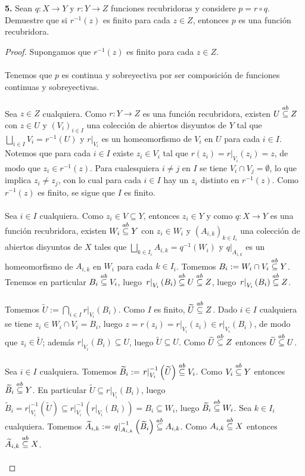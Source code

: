\textbf{5.} Sean $q:X\to Y$ y $r:Y\to Z$ funciones recubridoras y considere $p=r\circ q$. Demuestre que si $r^{-1}(z)$ es finito para cada $z\in Z$, entonces $p$ es una función recubridora.
\begin{proof}
   Supongamos que $r^{-1}(z)$ es finito para cada $z\in Z$.\\\\
   Tenemos que $p$ es continua y sobreyectiva por ser composición de funciones continuas y sobreyectivas.\\\\
   Sea $z\in Z$ cualquiera. Como $r:Y\to Z$ es una función recubridora, existen $U\stackrel{ab}{\subseteq} Z$ con $z\in U$ y $\left( V_i\right)_{i\in I}$ una colección de abiertos disyuntos de $Y$ tal que $\bigsqcup_{i\in I}V_i=r^{-1}(U)$ y $\left.r\right|_{V_i}$ es un homeomorfismo de $V_i$ en $U$ para cada $i\in I$. Notemos que para cada $i\in I$ existe $z_i\in V_i$ tal que $r(z_i)=\left.r\right|_{V_i}(z_i)=z$, de modo que $z_i\in r^{-1}(z)$. Para cualesquiera $i\ne j$ en $I$ se tiene $V_i\cap V_j=\emptyset$, lo que implica $z_i\ne z_j$, con lo cual para cada $i\in I$ hay un $z_i$ distinto en $r^{-1}(z)$. Como $r^{-1}(z)$ es finito, se sigue que $I$ es finito.\\\\
   Sea $i\in I$ cualquiera. Como $z_i\in V\subseteq Y$, entonces $z_i\in Y$ y como $q:X\to Y$ es una función recubridora, existen $W_i\stackrel{ab}{\subseteq} Y$ con $z_i\in W_i$ y $\left( A_{i,k}\right)_{k\in I_i}$ una colección de abiertos disyuntos de $X$ tales que $\bigsqcup_{k\in I_i}A_{i,k}=q^{-1}\left( W_i\right)$ y $\left.q\right|_{A_{i,k}}$ es un homeomorfismo de $A_{i,k}$ en $W_i$ para cada $k\in I_i$. Tomemos $B_i:=W_i\cap V_i\stackrel{ab}{\subseteq} Y$. Tenemos en particular $B_i\stackrel{ab}{\subseteq} V_i$, luego $\left.r\right|_{V_i}\left( B_i\right)\stackrel{ab}{\subseteq} U\stackrel{ab}{\subseteq} Z$, luego $\left.r\right|_{V_i}\left( B_i\right)\stackrel{ab}{\subseteq} Z$.\\\\
   Tomemos $\widetilde{U}:=\bigcap_{i\in I}\left.r\right|_{V_i}\left( B_i\right)$. Como $I$ es finito, $\widetilde{U}\stackrel{ab}{\subseteq} Z$. Dado $i\in I$ cualquiera se tiene $z_i\in W_i\cap V_i=B_i$, luego $z=r(z_i)=\left.r\right|_{V_i}(z_i)\in \left.r\right|_{V_i}\left( B_i\right)$, de modo que $z_i\in\widetilde{U}$; además $\left.r\right|_{V_i}\left( B_i\right)\subseteq U$, luego $\widetilde{U}\subseteq U$. Como $\widetilde{U}\stackrel{ab}{\subseteq} Z$ entonces $\widetilde{U}\stackrel{ab}{\subseteq} U$.\\\\
Sea $i\in I$ cualquiera. Tomemos $\widetilde{B}_i:=\left.r\right|_{V_i}^{-1}\left( \widetilde{U}\right)\stackrel{ab}{\subseteq} V_i$. Como $V_i\stackrel{ab}{\subseteq} Y$ entonces $\widetilde{B}_i\stackrel{ab}{\subseteq} Y$. En particular $\widetilde{U}\subseteq \left.r\right|_{V_i}\left( B_i\right)$, luego $\widetilde{B}_i=\left.r\right|_{V_i}^{-1}\left( \widetilde{U}\right)\subseteq \left.r\right|_{V_i}^{-1}\left( \left.r\right|_{V_i} \left( B_i\right)\right)=B_i\subseteq W_i$, luego $\widetilde{B}_i\stackrel{ab}{\subseteq} W_i$. Sea $k\in I_i$ cualquiera. Tomemos $\widetilde{A}_{i,k}:=\left.q\right|_{A_{i,k}}^{-1}\left( \widetilde{B}_i\right)\stackrel{ab}{\subseteq} A_{i,k}$. Como $A_{i,k}\stackrel{ab}{\subseteq} X$ entonces $\widetilde{A}_{i,k}\stackrel{ab}{\subseteq} X$.\\\\

\end{proof}
